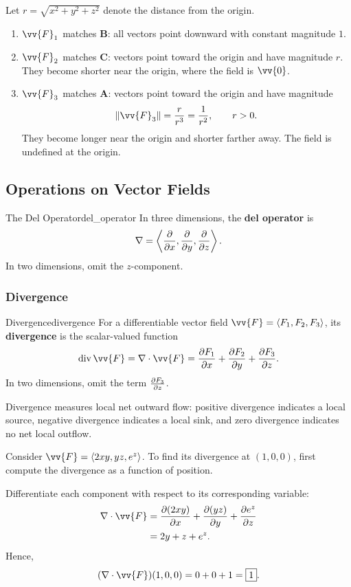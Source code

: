 \begin{example}
Let $r = \sqrt{x^2 + y^2 + z^2}$ denote the distance from the origin.
\begin{enumerate}
    \item $\vv{F}_1$ matches \textbf{B}: all vectors point downward with constant magnitude $1$.
    \item $\vv{F}_2$ matches \textbf{C}: vectors point toward the origin and have magnitude $r$. They become shorter near the origin, where the field is $\vv{0}$.
    \item $\vv{F}_3$ matches \textbf{A}: vectors point toward the origin and have magnitude
    \[
        \norm{\vv{F}_3} = \frac{r}{r^3} = \frac{1}{r^2},\qquad r > 0.
    \]
    They become longer near the origin and shorter farther away. The field is undefined at the origin.
\end{enumerate}
\end{example}

\newpage
\subsection{Operations on Vector Fields}

\begin{definition}{The Del Operator}{del_operator}
In three dimensions, the \textbf{del operator} is
\[
    \nabla = \left\langle \pdv{x},\pdv{y},\pdv{z} \right\rangle.
\]
In two dimensions, omit the $z$-component.
\end{definition}

\subsubsection{Divergence}

\begin{definition}{Divergence}{divergence}
For a differentiable vector field $\vv{F} = \ang{F_1,F_2,F_3}$, its \textbf{divergence} is the scalar-valued function
\[
    \operatorname{div}\vv{F} = \nabla\cdot\vv{F}
    = \pdv{F_1}{x} + \pdv{F_2}{y} + \pdv{F_3}{z}.
\]
In two dimensions, omit the term $\pdv{F_3}{z}$.
\end{definition}

Divergence measures local net outward flow: positive divergence indicates a local source, negative divergence indicates a local sink, and zero divergence indicates no net local outflow.

\begin{example}
Consider $\vv{F} = \ang{2xy,yz,e^z}$. To find its divergence at $(1,0,0)$, first compute the divergence as a function of position.

Differentiate each component with respect to its corresponding variable:
\begin{align*}
    \nabla\cdot\vv{F}
    &= \pdv{(2xy)}{x} + \pdv{(yz)}{y} + \pdv{e^z}{z}\\
    &= 2y + z + e^z.
\end{align*}
Hence,
\[
    (\nabla\cdot\vv{F})(1,0,0) = 0 + 0 + 1 = \boxed{1}.
\]
\end{example}

